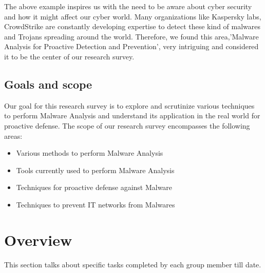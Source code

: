 \documentclass[11pt]{article}
\begin{document}
The above example inspires us with the need to be aware about cyber security and how it might affect our cyber world. Many organizations like Kaspersky labs, CrowdStrike are constantly developing expertise to detect these kind of malwares and Trojans spreading around the world. Therefore, we found this area,'Malware Analysis for Proactive Detection and Prevention', very intriguing and considered it to be the center of our research survey.
	\subsection{Goals and scope}
	Our goal for this research survey is to explore and scrutinize various techniques to perform Malware Analysis and understand its application in the real world for proactive defense.
	The scope of our research survey encompasses the following areas:
	\begin{itemize}[noitemsep]
		\item{Various methods to perform Malware Analysis}
		\item{Tools currently used to perform Malware Analysis} 
		\item{Techniques for proactive defense against Malware}
		\item{Techniques to prevent IT networks from Malwares}
	\end{itemize}


\section{Overview}
This section talks about specific tasks completed by each group member till date.
\end{document}
